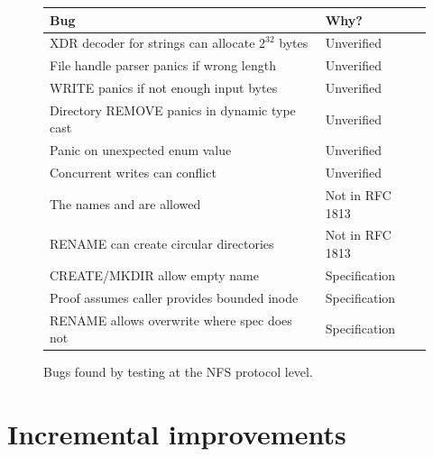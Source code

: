 \begin{figure}
  \begin{center}
  \begin{tabular}{@{}p{8cm}p{2.7cm}@{}}
    \toprule
    \textbf{Bug} & \textbf{Why?} \\
    \midrule
    XDR decoder for strings can allocate $2^{32}$ bytes & Unverified \\
    File handle parser panics if wrong length & Unverified \\
    WRITE panics if not enough input bytes & Unverified \\
    Directory REMOVE panics in dynamic type cast & Unverified \\
    Panic on unexpected enum value & Unverified \\
    Concurrent writes can conflict & Unverified \\
    The names \cc{.} and \cc{..} are allowed & Not in RFC 1813 \\
    RENAME can create circular directories & Not in RFC 1813 \\
    CREATE/MKDIR allow empty name & Specification \\
    Proof assumes caller provides bounded inode & Specification \\
    RENAME allows overwrite where spec does not & Specification \\
    \bottomrule
  \end{tabular}
  \end{center}
  \caption{Bugs found by testing at the NFS protocol level.}
  \label{fig:daisynfs-bugs}
\end{figure}


\section{Incremental improvements}
\label{sec:eval:incremental}

